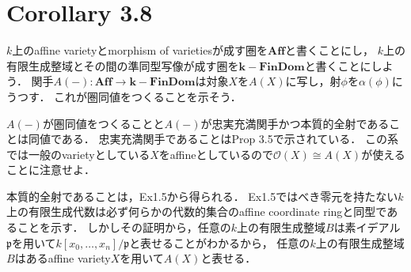 \documentclass[a4paper]{jarticle}
\newcommand{\I}[1]{\mathfrak{#1}}
\begin{document}
\section{Corollary 3.8}
    $k$上のaffine varietyとmorphism of varietiesが成す圏を$\mathbf{Aff}$と書くことにし，
    $k$上の有限生成整域とその間の準同型写像が成す圏を$\mathbf{k-FinDom}$と書くことにしよう．
    関手$A(-):\mathbf{Aff} \to \mathbf{k-FinDom}$は対象$X$を$A(X)$に写し，射$\phi$を$\alpha(\phi)$にうつす．
    これが圏同値をつくることを示そう．

    $A(-)$が圏同値をつくることと$A(-)$が忠実充満関手かつ本質的全射であることは同値である．
    忠実充満関手であることはProp 3.5で示されている．
    この系では一般のvarietyとしている$X$をaffineとしているので$\mathcal{O}(X) \cong A(X)$が使えることに注意せよ．

    本質的全射であることは，Ex1.5から得られる．
    Ex1.5ではべき零元を持たない$k$上の有限生成代数は必ず何らかの代数的集合のaffine coordinate ringと同型であることを示す．
    しかしその証明から，任意の$k$上の有限生成整域$B$は素イデアル$\I{p}$を用いて$k[x_0,\dots,x_n]/\I{p}$と表せることがわかるから，
    任意の$k$上の有限生成整域$B$はあるaffine variety$X$を用いて$A(X)$と表せる．
\end{document}

